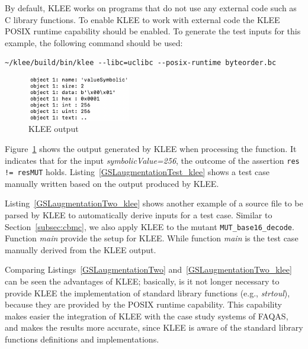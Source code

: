 By default, KLEE works on programs that do not use any external code such as C library functions. To enable KLEE to work with external code the KLEE POSIX runtime capability should be enabled. To generate the test inputs for this example, the following command should be used:

\begin{verbatim}
~/klee/build/bin/klee --libc=uclibc --posix-runtime byteorder.bc
\end{verbatim}

\begin{figure}[h]
\begin{center}
\includegraphics[width=0.4\textwidth]{images/klee_output_1}
\caption{KLEE output}
\label{fig:klee_output_1}
\end{center}
\end{figure}



Figure~\ref{fig:klee_output_1} shows the output generated by KLEE when processing the function. It indicates that for the input \emph{symbolicValue=256}, the outcome of the assertion \texttt{res != resMUT} holds. Listing~\ref{GSLaugmentationTest_klee} shows a test case manually written based on the output produced by KLEE.



Listing~\ref{GSLaugmentationTwo_klee} shows another example of a source file to be parsed by KLEE to automatically derive inputs for a test case. Similar to Section~\ref{subsec:cbmc}, we also apply KLEE to the mutant \texttt{MUT\_base16\_decode}. Function \emph{main} provide the setup for KLEE. While function \emph{main} is the test case manually derived from the KLEE output.

Comparing Listings~\ref{GSLaugmentationTwo} and~\ref{GSLaugmentationTwo_klee} can be seen the advantages of KLEE; basically, is it not longer necessary to provide KLEE the implementation of standard library functions (e.g., \emph{strtoul}), because they are provided by the POSIX runtime capability. This capability makes easier the integration of KLEE with the case study systems of FAQAS, and makes the results more accurate, since KLEE is aware of the standard library functions definitions and implementations.

